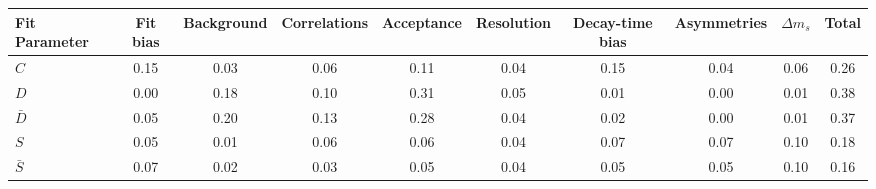 \begin{tabular}{l  c  c  c  c  c  c  c  c  | c }
\hline
\hline
Fit Parameter & Fit bias & Background & Correlations & Acceptance & Resolution & Decay-time bias & Asymmetries & $\Delta m_{s}$ &  Total  \\ 
\hline
$C$ & 0.15 & 0.03 & 0.06 & 0.11 & 0.04 & 0.15 & 0.04 & 0.06 & 0.26 \\ 
$D$ & 0.00 & 0.18 & 0.10 & 0.31 & 0.05 & 0.01 & 0.00 & 0.01 & 0.38 \\ 
$\bar{D}$ & 0.05 & 0.20 & 0.13 & 0.28 & 0.04 & 0.02 & 0.00 & 0.01 & 0.37 \\ 
$S$ & 0.05 & 0.01 & 0.06 & 0.06 & 0.04 & 0.07 & 0.07 & 0.10 & 0.18 \\ 
$\bar{S}$ & 0.07 & 0.02 & 0.03 & 0.05 & 0.04 & 0.05 & 0.05 & 0.10 & 0.16 \\ 
\hline
\hline
\end{tabular}
